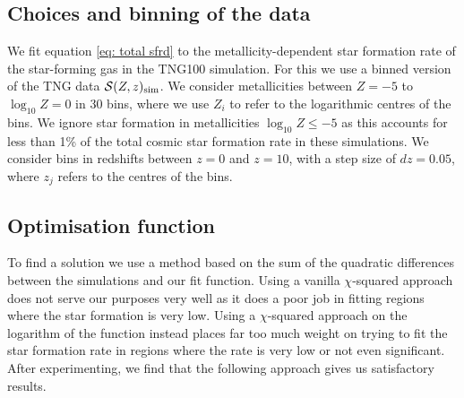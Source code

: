 \documentclass[twocolumn]{aastex631}
\newcommand{\SFRDzZ}{\ensuremath{\mathcal{S}(Z,z)}\xspace}
\begin{document}


\subsection{Choices and binning of the data}
We fit equation \ref{eq: total sfrd} to the metallicity-dependent star formation rate of the star-forming gas in the TNG100 simulation. For this we use a binned version of the TNG data $\SFRDzZ_{\rm sim}$. We consider metallicities between $Z= -5$ to $\log_{10} Z= 0$ in 30 bins, where we use $Z_i$ to refer to the logarithmic centres of the bins. We ignore star formation in metallicities $\log_{10} Z \le -5$ as this accounts for less than 1\% of the total cosmic star formation rate in these simulations.
We consider bins in redshifts between $z=0$ and $z=10$, with a step size of $dz=0.05$, where $z_j$ refers to the centres of the bins. 

\subsection{Optimisation function}
To find a solution we use a method based on the sum of the quadratic differences between the simulations and our fit function. Using a vanilla $\chi$-squared approach does not serve our purposes very well as it does a poor job in fitting regions where the star formation is very low.  Using a $\chi$-squared approach on the logarithm of the function instead places far too much weight on trying to fit the star formation rate in regions where the rate is very low or not even significant.  After experimenting, we find that the following approach gives us satisfactory results. 
\end{document}
